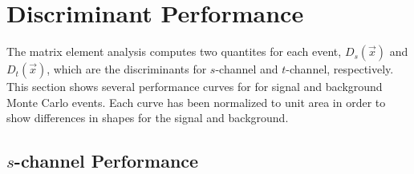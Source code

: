 \section{Discriminant Performance}

The matrix element analysis computes two quantites for each event,
$D_{s}(\vec{x})$ and $D_{t}(\vec{x})$, which are the discriminants for $s$-channel
and $t$-channel, respectively. This section shows several performance curves for
for signal and background Monte Carlo events. Each curve has been normalized to
unit area in order to show differences in shapes for the signal and background.

\subsection{$s$-channel Performance}

